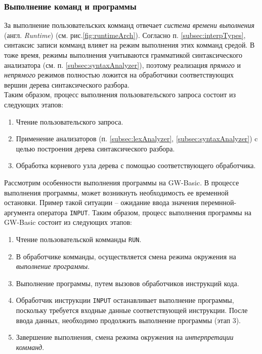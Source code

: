 \documentclass[12pt]{article}
\begin{document}
			\subsubsection{Выполнение команд и программы}
			\hspace{\parindent} За выполнение пользовательских комманд отвечает {\it система времени выполнения} (англ. {\it Runtime}) (см. рис.\ref{fig:runtimeArch}). Согласно п. \ref{subsec:interpTypes}, синтаксис записи комманд влияет на режим выполнения этих комманд средой. В тоже время, режимы выполнения учитываются грамматикой синтаксического анализатора (см. п. \ref{subsec:syntaxAnalyzer}), поэтому реализация {\it прямого} и {\it непрямого} режимов полностью ложится на обработчики соответствующих вершин дерева синтаксического разбора. \\   
			\indent Таким образом, процесс выполнения пользовательского запроса состоит из следующих этапов:
			\begin{enumerate}
				\item Чтение пользовательского запроса.
				\item Применение анализаторов (п. \ref{subsec:lexAnalyzer}, \ref{subsec:syntaxAnalyzer}) c целью построения дерева синтаксического разбора.
				\item Обработка корневого узла дерева с помощью соответствующего обработчика.
			\end{enumerate}

			\indent Рассмотрим особенности выполнения программы на GW-Basic. В процессе выполнения программы, может возникнуть необходимость ее временной остановки. Пример такой ситуации -- ожидание ввода значения перемнной-аргумента оператора {\tt INPUT}. Таким образом, процесс выполнения программы на GW-Basic состоит из следующих этапов:
			\begin{enumerate}
				\item Чтение пользовательской комманды {\tt RUN}.
				\item В обработчике комманды, осуществляется смена режима окружения на {\it выполнение программы}.
				\item Выполнение программы, путем вызовов обработчиков инструкций кода.
				\item Обработчик инструкции {\tt INPUT} останавливает выполнение программы, поскольку требуется входные данные соответствующей инструкции. После ввода данных, необходимо продолжить выполнение программы (этап 3).
				\item Завершение выполнения, смена режима окружения на {\it интерпретации комманд}.
			\end{enumerate}
\end{document}
